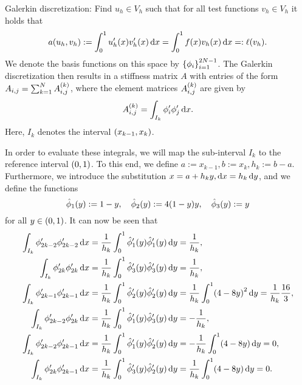 \documentclass[english]{exercise}
\begin{document}
    Galerkin discretization:
    Find \(u_h \in V_h\) such that for all test functions \(v_h \in V_h\) it holds that
    \[
        a\parentheses*{u_h, v_h} := \int_0^1 u_h'\parentheses*{x}v_h'\parentheses*{x}\d x = \int_0^1 f\parentheses*{x}v_h\parentheses*{x}\d x =: \ell\parentheses*{v_h}.
    \]
    We denote the basis functions on this space by \(\braces*{\phi_i}_{i = 1}^{2N - 1}\).
    The Galerkin discretization then results in a stiffness matrix \(A\) with entries of the form \(A_{i, j} = \sum_{k = 1}^N A_{i, j}^{\parentheses*{k}}\), where the element matrices \(A_{i,j}^{\parentheses*{k}}\) are given by
    \[
        A_{i, j}^{\parentheses*{k}} = \int_{I_k} \phi_i'\phi_j'\d x.
    \]
    Here, \(I_k\) denotes the interval \(\parentheses*{x_{k - 1}, x_k}\).
    
    In order to evaluate these integrals, we will map the sub-interval \(I_k\) to the reference interval \(\parentheses*{0, 1}\).
    To this end, we define \(a := x_{k - 1}, b:= x_k, h_k := b - a\).
    Furthermore, we introduce the substitution \(x = a + h_k y, \d x = h_k \d y\), and we define the functions
    \[
        \hat{\phi}_1\parentheses*{y} := 1 - y, \quad \hat{\phi}_2\parentheses*{y} := 4\parentheses*{1 - y}y, \quad \hat{\phi}_3\parentheses*{y} := y
    \]
    for all \(y \in \parentheses*{0, 1}\).
    It can now be seen that
    \begin{align*}
        \int_{I_k}\phi_{2k - 2}'\phi_{2k - 2}'\d x &= \frac{1}{h_k}\int_0^1 \hat{\phi}_1'\parentheses*{y}\hat{\phi}_1'\parentheses*{y}\d y = \frac{1}{h_k},\\
        \int_{I_k}\phi_{2k}'\phi_{2k}'\d x &= \frac{1}{h_k}\int_0^1 \hat{\phi}_3'\parentheses*{y}\hat{\phi}_3'\parentheses*{y}\d y = \frac{1}{h_k},\\
        \int_{I_k}\phi_{2k - 1}'\phi_{2k - 1}'\d x &= \frac{1}{h_k}\int_0^1 \hat{\phi}_2'\parentheses*{y}\hat{\phi}_2'\parentheses*{y}\d y = \frac{1}{h_k}\int_0^1 \parentheses*{4 - 8y}^2\d y = \frac{1}{h_k}\frac{16}{3},\\
        \int_{I_k}\phi_{2k - 2}'\phi_{2k}'\d x &= \frac{1}{h_k}\int_0^1 \hat{\phi}_1'\parentheses*{y}\hat{\phi}_3'\parentheses*{y}\d y = -\frac{1}{h_k},\\
        \int_{I_k}\phi_{2k - 2}'\phi_{2k - 1}'\d x &= \frac{1}{h_k}\int_0^1 \hat{\phi}_1'\parentheses*{y}\hat{\phi}_2'\parentheses*{y}\d y = -\frac{1}{h_k}\int_0^1 \parentheses*{4 - 8y}\d y = 0,\\
        \int_{I_k}\phi_{2k}'\phi_{2k - 1}'\d x &= \frac{1}{h_k}\int_0^1 \hat{\phi}_3'\parentheses*{y}\hat{\phi}_2'\parentheses*{y}\d y = \frac{1}{h_k}\int_0^1 \parentheses*{4 - 8y}\d y = 0.
    \end{align*}
\end{document}

